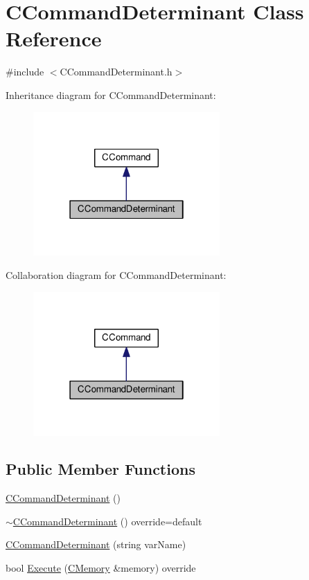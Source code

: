 \hypertarget{classCCommandDeterminant}{}\section{C\+Command\+Determinant Class Reference}
\label{classCCommandDeterminant}


{\ttfamily \#include $<$C\+Command\+Determinant.\+h$>$}



Inheritance diagram for C\+Command\+Determinant\+:\nopagebreak
\begin{figure}[H]
\begin{center}
\leavevmode
\includegraphics[width=202pt]{classCCommandDeterminant__inherit__graph}
\end{center}
\end{figure}


Collaboration diagram for C\+Command\+Determinant\+:\nopagebreak
\begin{figure}[H]
\begin{center}
\leavevmode
\includegraphics[width=202pt]{classCCommandDeterminant__coll__graph}
\end{center}
\end{figure}
\subsection*{Public Member Functions}
\begin{DoxyCompactItemize}
\item 
\hyperlink{classCCommandDeterminant_a040acf83a2a792f5bdc8e84d4d7ea986}{C\+Command\+Determinant} ()
\item 
\hyperlink{classCCommandDeterminant_ae9ac7cf4568af2805d18ddb65824635b}{$\sim$\+C\+Command\+Determinant} () override=default
\item 
\hyperlink{classCCommandDeterminant_a193c274c4ba951b425bf390347fa7d59}{C\+Command\+Determinant} (string var\+Name)
\item 
bool \hyperlink{classCCommandDeterminant_ad472106c8565309dc1f32d2559b421ec}{Execute} (\hyperlink{classCMemory}{C\+Memory} \&memory) override
\end{DoxyCompactItemize}
